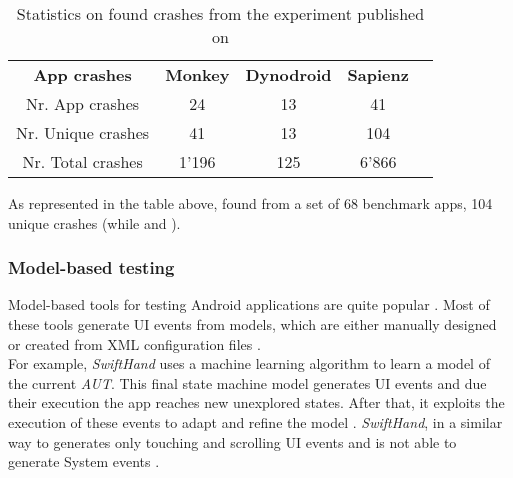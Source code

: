 \begin{table}[htb]
\centering
\caption{Statistics on found crashes from the \sapienz experiment published on \cite{sapienz}}
\label{sapienz experiment results}
\begin{tabular}{|c|c|c|c|l}
\cline{1-4}
\textbf{App crashes} & \textbf{Monkey} & \textbf{Dynodroid} & \textbf{Sapienz} &  \\ \cline{1-4}
Nr. App crashes      & 24              & 13                 & 41               &  \\ \cline{1-4}
Nr. Unique crashes   & 41              & 13                 & 104              &  \\ \cline{1-4}
Nr. Total crashes    & 1'196           & 125                & 6'866             &  \\ \cline{1-4}
\end{tabular}
\end{table}
As represented in the table above, \sapienz found from a set of 68 benchmark apps, 104 unique crashes (while  and ).

\subsubsection{Model-based testing}
Model-based tools for testing Android applications are quite popular \cite{sapienz}. Most of these tools \cite{mobiguitar, mining, guiripper,swift} generate UI events from models, which are either manually designed or created from XML configuration files \cite{sapienz}. \\
For example, \textit{SwiftHand} \cite{swift} uses a machine learning algorithm to learn a model of the current \textit{AUT}. This final state machine model \cite{areWeThereYet} generates UI events and due their execution the app reaches new unexplored states. After that, it exploits the execution of these events to adapt and refine the model \cite{swift}. \textit{SwiftHand}, in a similar way to \monkey generates only touching and scrolling UI events and is not able to generate System events \cite{areWeThereYet}.

